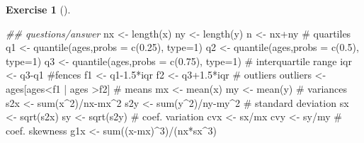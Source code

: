 \documentclass[
  a4paper,
]{scrreport}
\newenvironment{Shaded}{\begin{snugshade}}{\end{snugshade}}
\newcommand{\AttributeTok}[1]{\textcolor[rgb]{0.40,0.45,0.13}{#1}}
\newcommand{\CommentTok}[1]{\textcolor[rgb]{0.37,0.37,0.37}{#1}}
\newcommand{\DecValTok}[1]{\textcolor[rgb]{0.68,0.00,0.00}{#1}}
\newcommand{\DocumentationTok}[1]{\textcolor[rgb]{0.37,0.37,0.37}{\textit{#1}}}
\newcommand{\FloatTok}[1]{\textcolor[rgb]{0.68,0.00,0.00}{#1}}
\newcommand{\FunctionTok}[1]{\textcolor[rgb]{0.28,0.35,0.67}{#1}}
\newcommand{\NormalTok}[1]{\textcolor[rgb]{0.00,0.23,0.31}{#1}}
\newcommand{\OtherTok}[1]{\textcolor[rgb]{0.00,0.23,0.31}{#1}}
\newcommand{\SpecialCharTok}[1]{\textcolor[rgb]{0.37,0.37,0.37}{#1}}
\theoremstyle{definition}
\newtheorem{exercise}{Exercise}[chapter]
\theoremstyle{remark}
\begin{document}
\begin{exercise}[]
\begin{Shaded}
\begin{Highlighting}[]
\DocumentationTok{\#\# questions/answer}
\NormalTok{nx }\OtherTok{\textless{}{-}} \FunctionTok{length}\NormalTok{(x)}
\NormalTok{ny }\OtherTok{\textless{}{-}} \FunctionTok{length}\NormalTok{(y)}
\NormalTok{n }\OtherTok{\textless{}{-}}\NormalTok{ nx}\SpecialCharTok{+}\NormalTok{ny}
\CommentTok{\# quartiles}
\NormalTok{q1 }\OtherTok{\textless{}{-}} \FunctionTok{quantile}\NormalTok{(ages,}\AttributeTok{probs =} \FunctionTok{c}\NormalTok{(}\FloatTok{0.25}\NormalTok{), }\AttributeTok{type=}\DecValTok{1}\NormalTok{)}
\NormalTok{q2 }\OtherTok{\textless{}{-}} \FunctionTok{quantile}\NormalTok{(ages,}\AttributeTok{probs =} \FunctionTok{c}\NormalTok{(}\FloatTok{0.5}\NormalTok{), }\AttributeTok{type=}\DecValTok{1}\NormalTok{)}
\NormalTok{q3 }\OtherTok{\textless{}{-}} \FunctionTok{quantile}\NormalTok{(ages,}\AttributeTok{probs =} \FunctionTok{c}\NormalTok{(}\FloatTok{0.75}\NormalTok{), }\AttributeTok{type=}\DecValTok{1}\NormalTok{)}
\CommentTok{\# interquartile range}
\NormalTok{iqr }\OtherTok{\textless{}{-}}\NormalTok{ q3}\SpecialCharTok{{-}}\NormalTok{q1}
\CommentTok{\#fences}
\NormalTok{f1 }\OtherTok{\textless{}{-}}\NormalTok{ q1}\FloatTok{{-}1.5}\SpecialCharTok{*}\NormalTok{iqr}
\NormalTok{f2 }\OtherTok{\textless{}{-}}\NormalTok{ q3}\FloatTok{+1.5}\SpecialCharTok{*}\NormalTok{iqr}
\CommentTok{\# outliers}
\NormalTok{outliers }\OtherTok{\textless{}{-}}\NormalTok{ ages[ages}\SpecialCharTok{\textless{}}\NormalTok{f1 }\SpecialCharTok{|}\NormalTok{ ages }\SpecialCharTok{\textgreater{}}\NormalTok{f2]}
\CommentTok{\# means}
\NormalTok{mx }\OtherTok{\textless{}{-}} \FunctionTok{mean}\NormalTok{(x)}
\NormalTok{my }\OtherTok{\textless{}{-}} \FunctionTok{mean}\NormalTok{(y)}
\CommentTok{\# variances}
\NormalTok{s2x }\OtherTok{\textless{}{-}} \FunctionTok{sum}\NormalTok{(x}\SpecialCharTok{\^{}}\DecValTok{2}\NormalTok{)}\SpecialCharTok{/}\NormalTok{nx}\SpecialCharTok{{-}}\NormalTok{mx}\SpecialCharTok{\^{}}\DecValTok{2}
\NormalTok{s2y }\OtherTok{\textless{}{-}} \FunctionTok{sum}\NormalTok{(y}\SpecialCharTok{\^{}}\DecValTok{2}\NormalTok{)}\SpecialCharTok{/}\NormalTok{ny}\SpecialCharTok{{-}}\NormalTok{my}\SpecialCharTok{\^{}}\DecValTok{2}
\CommentTok{\# standard deviation}
\NormalTok{sx }\OtherTok{\textless{}{-}} \FunctionTok{sqrt}\NormalTok{(s2x)}
\NormalTok{sy }\OtherTok{\textless{}{-}} \FunctionTok{sqrt}\NormalTok{(s2y)}
\CommentTok{\# coef. variation}
\NormalTok{cvx }\OtherTok{\textless{}{-}}\NormalTok{ sx}\SpecialCharTok{/}\NormalTok{mx}
\NormalTok{cvy }\OtherTok{\textless{}{-}}\NormalTok{ sy}\SpecialCharTok{/}\NormalTok{my}
\CommentTok{\# coef. skewness}
\NormalTok{g1x }\OtherTok{\textless{}{-}} \FunctionTok{sum}\NormalTok{((x}\SpecialCharTok{{-}}\NormalTok{mx)}\SpecialCharTok{\^{}}\DecValTok{3}\NormalTok{)}\SpecialCharTok{/}\NormalTok{(nx}\SpecialCharTok{*}\NormalTok{sx}\SpecialCharTok{\^{}}\DecValTok{3}\NormalTok{)}

\end{Highlighting}
\end{Shaded}
\end{exercise}
\end{document}

